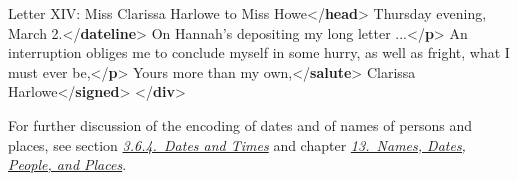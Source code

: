 \begin{shaded}
Letter XIV: Miss Clarissa Harlowe to Miss Howe{</\textbf{head}>}\mbox{}\newline 
{}\mbox{}\newline 
\hspace*{1em}Thursday evening, March 2.{</\textbf{dateline}>}\mbox{}\newline 
{}\mbox{}\newline 
{}On Hannah's depositing my long letter ...{</\textbf{p}>}\mbox{}\newline 
{}An interruption obliges me to conclude myself\mbox{}\newline 
\hspace*{1em}\hspace*{1em} in some hurry, as well as fright, what I must ever be,{</\textbf{p}>}\mbox{}\newline 
{}\mbox{}\newline 
\hspace*{1em}Yours more than my own,{</\textbf{salute}>}\mbox{}\newline 
\hspace*{1em}Clarissa Harlowe{</\textbf{signed}>}\mbox{}\newline 
{}\mbox{}\newline 
{</\textbf{div}>}\end{shaded}\egroup\par \noindent  \par
For further discussion of the encoding of dates and of names of persons and places, see section \textit{\hyperref[CONADA]{3.6.4.\ Dates and Times}} and chapter \textit{\hyperref[ND]{13.\ Names, Dates, People, and Places}}.
